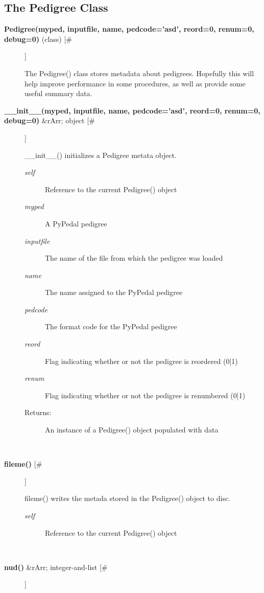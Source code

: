 \subsection*{The Pedigree Class}
\begin{description}
\item[\textbf{Pedigree(myped, inputfile, name, pedcode='asd', reord=0, renum=0, debug=0)}
 (class) [\#]]

 The Pedigree() class stores metadata about pedigrees. Hopefully this will help improve performance in some procedures, as well as provide some useful summary data.

\item[\textbf{\_\_init\_\_(myped, inputfile, name, pedcode='asd', reord=0, renum=0, debug=0)}
 \&rArr; object [\#]]

 \_\_init\_\_() initializes a Pedigree metata object.
\begin{description}
\item[\emph{self}
] Reference to the current Pedigree() object
\item[\emph{myped}
] A PyPedal pedigree
\item[\emph{inputfile}
] The name of the file from which the pedigree was loaded
\item[\emph{name}
] The name assigned to the PyPedal pedigree
\item[\emph{pedcode}
] The format code for the PyPedal pedigree
\item[\emph{reord}
] Flag indicating whether or not the pedigree is reordered (0|1)
\item[\emph{renum}
] Flag indicating whether or not the pedigree is renumbered (0|1)
\item[Returns:] An instance of a Pedigree() object populated with data

\end{description}
\\ 

\item[\textbf{fileme()}
 [\#]]

 fileme() writes the metada stored in the Pedigree() object to disc.
\begin{description}
\item[\emph{self}
] Reference to the current Pedigree() object

\end{description}
\\ 

\item[\textbf{nud()}
 \&rArr; integer-and-list [\#]]


\end{description}
